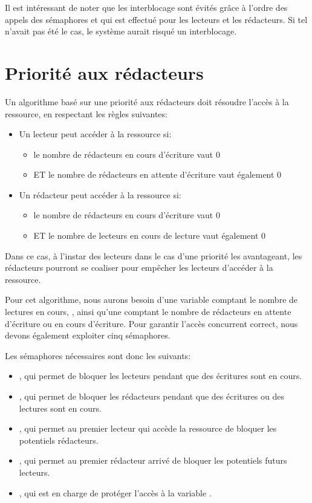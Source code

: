 Il est intéressant de noter que les interblocage sont évités grâce
à l'ordre des appels des sémaphores  et  qui est effectué pour les lecteurs et les rédacteurs.
Si tel n'avait pas été le cas, le système aurait risqué un interblocage.

\section{Priorité aux rédacteurs}
Un algorithme basé sur une priorité aux rédacteurs doit résoudre l'accès à la ressource, en respectant les règles suivantes:
\begin{itemize}
  \item Un lecteur peut accéder à la ressource si:
        \begin{itemize}
          \item le nombre de rédacteurs en cours d'écriture vaut 0
          \item ET le nombre de rédacteurs en attente d'écriture vaut également 0
        \end{itemize}
  \item Un rédacteur peut accéder à la ressource si:
        \begin{itemize}
          \item le nombre de rédacteurs en cours d'écriture vaut 0
          \item ET le nombre de lecteurs en cours de lecture vaut également 0
        \end{itemize}
\end{itemize}

Dans ce cas, à l'instar des lecteurs dans le cas d'une priorité les avantageant, les rédacteurs pourront se coaliser pour empêcher les lecteurs d'accéder à la ressource.

Pour cet algorithme, nous aurons besoin d'une variable comptant le nombre de lectures en cours, , ainsi qu'une comptant le nombre de rédacteurs en attente d'écriture ou en cours d'écriture. Pour garantir l'accès concurrent correct, nous devons également exploiter cinq sémaphores.

Les sémaphores nécessaires sont donc les suivants:
\begin{itemize}
  \item {}, qui permet de bloquer les lecteurs pendant que des écritures sont en cours.
  \item {}, qui permet de bloquer les rédacteurs pendant que des écritures ou des lectures sont en cours.
  \item {}, qui permet au premier lecteur qui accède la ressource de bloquer les potentiels rédacteurs.
  \item {}, qui permet au premier rédacteur arrivé de bloquer les potentiels futurs lecteurs.
  \item {}, qui est en charge de protéger l'accès à la variable .
\end{itemize}

